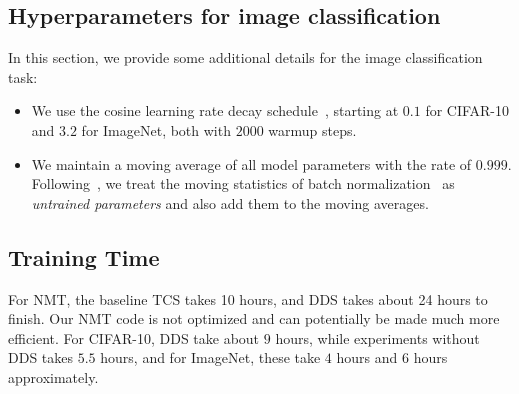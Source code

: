 \subsection{\label{app:image_hparam} Hyperparameters for image classification}
In this section, we provide some additional details for the image classification task:
\begin{itemize}
  \item We use the cosine learning rate decay schedule~\citep{cosine_lr}, starting at $0.1$ for CIFAR-10 and $3.2$ for ImageNet, both with $2000$ warmup steps. 
  \item We maintain a moving average of all model parameters with the rate of $0.999$. Following~\citet{imagenet_generalize_better}, we treat the moving statistics of batch normalization~\citep{batch_norm} as \textit{untrained parameters} and also add them to the moving averages. 
\end{itemize}


\subsection{Training Time}
For NMT, the baseline TCS takes 10 hours, and DDS takes about 24 hours to finish. Our NMT code is not optimized and can potentially be made much more efficient. 
For CIFAR-10, DDS take about $9$ hours, while experiments without DDS takes $5.5$ hours, and for ImageNet, these take $4$ hours and $6$ hours approximately. 

